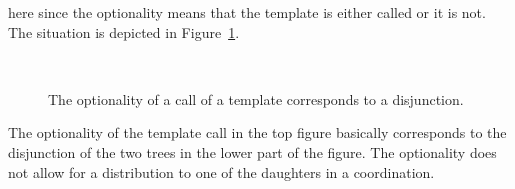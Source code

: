 here since the optionality means that the template is either called or it is not. The situation is
depicted in Figure~\ref{fig-optionality-coordination}.
\begin{figure}
 \raisebox{2cm}{\scalebox{.8}{$\equiv$}} \\

\hfill{}\hfill \raisebox{2cm}{\scalebox{.8}{$\vee$}} \hfill
{}\hfill\mbox{}
\caption{The optionality of a call of a template corresponds to a disjunction.}\label{fig-optionality-coordination}
\end{figure}
The optionality of the template call in the top figure basically corresponds to the disjunction of
the two trees in the lower part of the figure. The optionality does not allow for a distribution to one of the daughters in a coordination.

